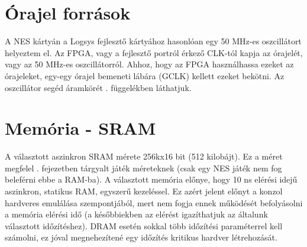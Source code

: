 \section{Órajel források}
	
	A NES kártyán a Logsys fejlesztő kártyához hasonlóan egy 50 MHz-es oszcillátort helyeztem el. Az FPGA, vagy a fejlesztő portról érkező CLK-tól kapja az órajelét, vagy az 50 MHz-es oszcillátorról. Ahhoz, hogy az FPGA használhassa ezeket az órajeleket, egy-egy órajel bemeneti lábára (GCLK) kellett ezeket bekötni. Az oszcillátor segéd áramkörét . függelékben láthatjuk. %
	
	
\section{Memória - SRAM}
	
	A választott aszinkron SRAM mérete 256kx16 bit (512 kilobájt). Ez a méret megfelel . fejezetben tárgyalt játék méreteknek (csak egy NES játék nem fog beleférni ebbe a RAM-ba). A választott memória előnye, hogy 10 ns elérési idejű aszinkron, statikus RAM, egyszerű kezeléssel. Ez azért jelent előnyt a konzol hardveres emulálása szempontjából, mert nem fogja ennek működését befolyásolni a memória elérési idő (a későbbiekben az elérést igazíthatjuk az általunk választott időzítéshez). DRAM esetén sokkal több időzítési paraméterrel kell számolni, ez jóval megnehezítené egy időzítés kritikus hardver létrehozását.
	
